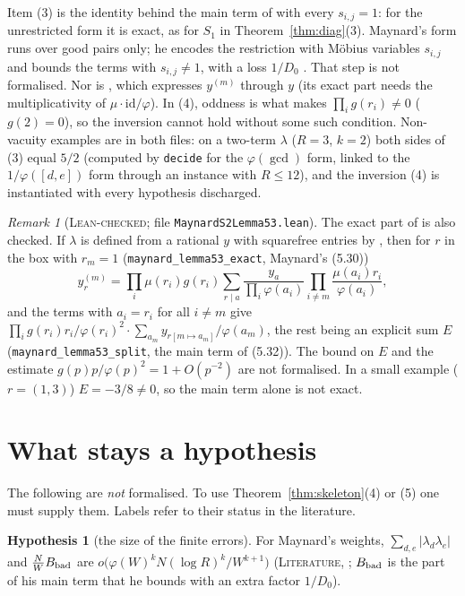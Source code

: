 \documentclass[11pt]{amsart}
\theoremstyle{definition}
\newtheorem{hypothesis}[theorem]{Hypothesis}
\theoremstyle{remark}
\newtheorem{remark}[theorem]{Remark}
\newcommand{\lbl}[1]{\textup{\textsc{#1}}}
\newcommand{\tl}[1]{\texttt{#1}}
\begin{document}
\noindent Item (3) is the identity behind the main term of \cite[(5.24)]{May15} with every
$s_{i,j}=1$: for the unrestricted form it is exact, as for $S_1$ in
Theorem~\ref{thm:diag}(3). Maynard's form runs over good pairs only; he encodes the restriction with
M\"obius variables $s_{i,j}$ and bounds the terms with $s_{i,j}\ne1$, with a loss $1/D_0$ \cite[(5.22), (5.24)--(5.25)]{May15}. That
step is not formalised. Nor is \cite[Lemma~5.3]{May15}, which expresses $y^{(m)}$ through $y$ (its
exact part needs the multiplicativity of $\mu\cdot\mathrm{id}/\varphi$). In (4), oddness is what
makes $\prod_ig(r_i)\ne0$ ($g(2)=0$), so the inversion cannot hold without some such condition.
Non-vacuity examples are in both files: on a two-term $\lambda$ ($R=3$, $k=2$) both sides of (3)
equal $5/2$ (computed by \tl{decide} for the $\varphi(\gcd)$ form, linked to the $1/\varphi([d,e])$ form through
an instance with $R\le12$), and the inversion (4) is instantiated with every hypothesis discharged.

\begin{remark}[\lbl{Lean-checked}; file \tl{MaynardS2Lemma53.lean}]\label{rem:l53}
The exact part of \cite[Lemma~5.3]{May15} is also checked. If $\lambda$ is defined from a rational $y$ with squarefree
entries by \cite[(5.8)]{May15}, then for $r$ in the box with $r_m=1$ (\tl{maynard\_lemma53\_exact}, Maynard's (5.30))
\[
y^{(m)}_r=\prod_i\mu(r_i)g(r_i)\sum_{r\mid a}\frac{y_a}{\prod_i\varphi(a_i)}\prod_{i\ne m}\frac{\mu(a_i)r_i}{\varphi(a_i)},
\]
and the terms with $a_i=r_i$ for all $i\ne m$ give
$\prod_ig(r_i)r_i/\varphi(r_i)^2\cdot\sum_{a_m}y_{r[m\mapsto a_m]}/\varphi(a_m)$, the rest being an explicit
sum $E$ (\tl{maynard\_lemma53\_split}, the main term of (5.32)). The bound on $E$ and the estimate
$g(p)p/\varphi(p)^2=1+O(p^{-2})$ are not formalised. In a small example ($r=(1,3)$) $E=-3/8\ne0$, so the main term
alone is not exact.
\end{remark}


\section{What stays a hypothesis}\label{sec:hyp}

The following are \emph{not} formalised. To use Theorem~\ref{thm:skeleton}(4) or
(5) one must supply them. Labels refer to their status in the literature.

\begin{hypothesis}[the size of the finite errors]\label{hyp:err}
For Maynard's weights, $\sum_{d,e}|\lambda_d\lambda_e|$ and $\frac NWB_{\rm bad}$ are
$o\big(\varphi(W)^kN(\log R)^k/W^{k+1}\big)$
(\lbl{Literature}, \cite[proof of Lemma~5.1]{May15}; $B_{\rm bad}$ is the part
of his main term that he bounds with an extra factor $1/D_0$).
\end{hypothesis}
\end{document}
